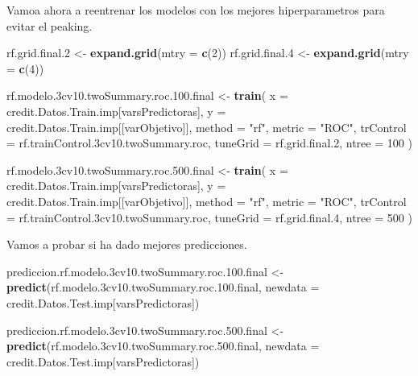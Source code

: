 \documentclass[
]{article}
\newenvironment{Shaded}{\begin{snugshade}}{\end{snugshade}}
\newcommand{\AttributeTok}[1]{\textcolor[rgb]{0.13,0.29,0.53}{#1}}
\newcommand{\DecValTok}[1]{\textcolor[rgb]{0.00,0.00,0.81}{#1}}
\newcommand{\FloatTok}[1]{\textcolor[rgb]{0.00,0.00,0.81}{#1}}
\newcommand{\FunctionTok}[1]{\textcolor[rgb]{0.13,0.29,0.53}{\textbf{#1}}}
\newcommand{\NormalTok}[1]{#1}
\newcommand{\OtherTok}[1]{\textcolor[rgb]{0.56,0.35,0.01}{#1}}
\newcommand{\StringTok}[1]{\textcolor[rgb]{0.31,0.60,0.02}{#1}}
\begin{document}
Vamoa ahora a reentrenar los modelos con los mejores hiperparametros
para evitar el peaking.

\begin{Shaded}
\begin{Highlighting}[]
\NormalTok{rf.grid.final}\FloatTok{.2} \OtherTok{\textless{}{-}} \FunctionTok{expand.grid}\NormalTok{(}\AttributeTok{mtry =} \FunctionTok{c}\NormalTok{(}\DecValTok{2}\NormalTok{))}
\NormalTok{rf.grid.final}\FloatTok{.4} \OtherTok{\textless{}{-}} \FunctionTok{expand.grid}\NormalTok{(}\AttributeTok{mtry =} \FunctionTok{c}\NormalTok{(}\DecValTok{4}\NormalTok{))}


\NormalTok{rf.modelo}\FloatTok{.3}\NormalTok{cv10.twoSummary.roc.}\FloatTok{100.}\NormalTok{final }\OtherTok{\textless{}{-}} \FunctionTok{train}\NormalTok{(}
  \AttributeTok{x =}\NormalTok{ credit.Datos.Train.imp[varsPredictoras],}
  \AttributeTok{y =}\NormalTok{ credit.Datos.Train.imp[[varObjetivo]],}
  \AttributeTok{method =} \StringTok{"rf"}\NormalTok{, }
  \AttributeTok{metric =} \StringTok{"ROC"}\NormalTok{,}
  \AttributeTok{trControl =}\NormalTok{ rf.trainControl}\FloatTok{.3}\NormalTok{cv10.twoSummary.roc,}
  \AttributeTok{tuneGrid =}\NormalTok{ rf.grid.final}\FloatTok{.2}\NormalTok{,}
  \AttributeTok{ntree =} \DecValTok{100}
\NormalTok{)}

\NormalTok{rf.modelo}\FloatTok{.3}\NormalTok{cv10.twoSummary.roc.}\FloatTok{500.}\NormalTok{final }\OtherTok{\textless{}{-}} \FunctionTok{train}\NormalTok{(}
  \AttributeTok{x =}\NormalTok{ credit.Datos.Train.imp[varsPredictoras],}
  \AttributeTok{y =}\NormalTok{ credit.Datos.Train.imp[[varObjetivo]],}
  \AttributeTok{method =} \StringTok{"rf"}\NormalTok{, }
  \AttributeTok{metric =} \StringTok{"ROC"}\NormalTok{,}
  \AttributeTok{trControl =}\NormalTok{ rf.trainControl}\FloatTok{.3}\NormalTok{cv10.twoSummary.roc,}
  \AttributeTok{tuneGrid =}\NormalTok{ rf.grid.final}\FloatTok{.4}\NormalTok{,}
  \AttributeTok{ntree =} \DecValTok{500}
\NormalTok{)}
\end{Highlighting}
\end{Shaded}

Vamos a probar si ha dado mejores predicciones.

\begin{Shaded}
\begin{Highlighting}[]
\NormalTok{prediccion.rf.modelo}\FloatTok{.3}\NormalTok{cv10.twoSummary.roc.}\FloatTok{100.}\NormalTok{final }\OtherTok{\textless{}{-}} \FunctionTok{predict}\NormalTok{(rf.modelo}\FloatTok{.3}\NormalTok{cv10.twoSummary.roc.}\FloatTok{100.}\NormalTok{final, }\AttributeTok{newdata =}\NormalTok{ credit.Datos.Test.imp[varsPredictoras])}

\NormalTok{prediccion.rf.modelo}\FloatTok{.3}\NormalTok{cv10.twoSummary.roc.}\FloatTok{500.}\NormalTok{final }\OtherTok{\textless{}{-}} \FunctionTok{predict}\NormalTok{(rf.modelo}\FloatTok{.3}\NormalTok{cv10.twoSummary.roc.}\FloatTok{500.}\NormalTok{final, }\AttributeTok{newdata =}\NormalTok{ credit.Datos.Test.imp[varsPredictoras])}
\end{Highlighting}
\end{Shaded}
\end{document}
